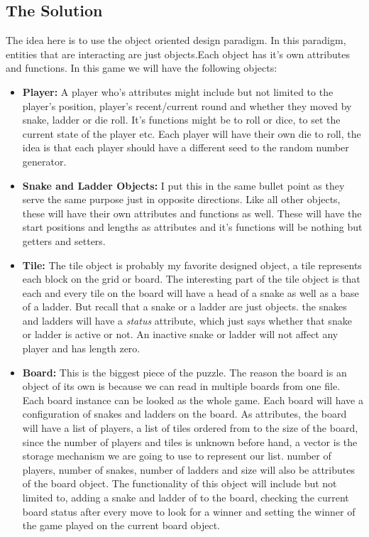 \subsection*{The Solution}
The idea here is to use the object oriented design paradigm. In this paradigm, entities that are interacting are just objects.Each object has it's own attributes and functions. In this game we will have the following objects:
\begin{itemize}
	\item \textbf{Player:} A player who's attributes might include but not limited to the player's position, player's recent/current round and whether they moved by snake, ladder or die roll. It's functions might be to roll or dice, to set the current state of the player etc. Each player will have their own die to roll, the idea is that each player should have a different seed to the random number generator. 
	\item \textbf{Snake and Ladder Objects:} I put this in the same bullet point as they serve the same purpose just in opposite directions. Like all other objects, these will have their own  attributes and functions as well. These will have the start positions and lengths as attributes and it's functions will be nothing but getters and setters.
	\item \textbf{Tile:} The tile object is probably my favorite designed object, a tile represents each block on the grid or board. The interesting part of the tile object is that each and every tile on the board will have a head of a snake as well as a base of a ladder. But recall that a snake or a ladder are just objects. the snakes and ladders will have a \textit{status} attribute, which just says whether that snake or ladder is active or not. An inactive snake or ladder will not affect any player and has length zero.
	\item \textbf{Board:} This is the biggest piece of the puzzle. The reason the board is an object of its own is because we can read in multiple boards from one file. Each board instance can be looked as the whole game. Each board will have a configuration of snakes and ladders on the board. As attributes, the board will have a list of players, a list of tiles ordered from to the size of the board, since the number of players and tiles is unknown before hand, a vector is the storage mechanism we are going to use to represent our list. number of players, number of snakes, number of ladders and size will also be attributes of the board object. The functionality of this object will include but not limited to, adding a snake and ladder of to the board, checking the current board status after every move to look for a winner and setting the winner of the game played on the current board object.
\end{itemize}

